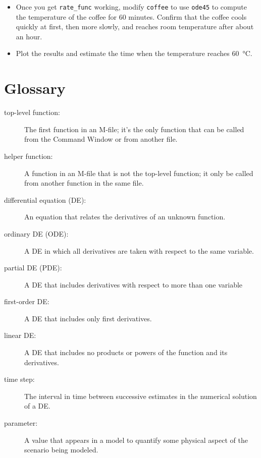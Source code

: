 \begin{ex}
\begin{itemize}
\item Once you get \verb"rate_func" working, modify
{\tt coffee} to use {\tt ode45} to compute the temperature
of the coffee for 60 minutes.  Confirm that
the coffee cools quickly at first, then more slowly, and reaches
room temperature after about an hour.

\item Plot the results and estimate the time when the temperature reaches \SI{60}{\celsius}.

\end{itemize}

\end{ex}


\section{Glossary}

\begin{description}

\item[top-level function:]  The first function in an M-file;
it's the only function that can be called from the Command
Window or from another file.

\item[helper function:] A function in an M-file that is not
the top-level function; it only be called from another function
in the same file.

\item[differential equation (DE):] An equation that relates the
derivatives of an unknown function.

\item[ordinary DE (ODE):] A DE in which all derivatives are taken with
respect to the same variable.

\item[partial DE (PDE):] A DE that includes derivatives with respect to more than one variable

\item[first-order DE:] A DE that includes only first derivatives.

\item[linear DE:] A DE that includes no products or powers of the
function and its derivatives.

\item[time step:] The interval in time between successive estimates
in the numerical solution of a DE.

\item[parameter:] A value that appears in a model to quantify some
physical aspect of the scenario being modeled.

\end{description}

